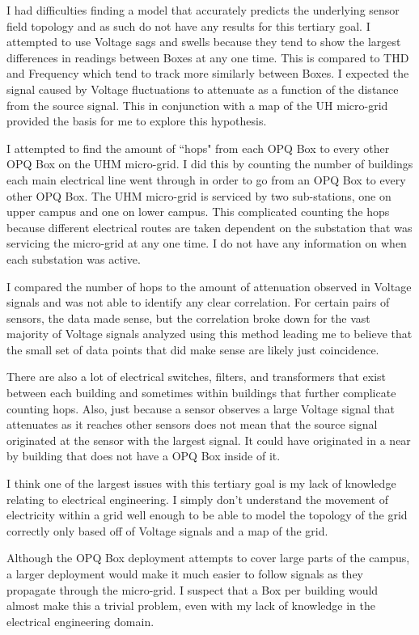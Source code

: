 I had difficulties finding a model that accurately predicts the underlying sensor field topology and as such do not have any results for this tertiary goal. I attempted to use Voltage sags and swells because they tend to show the largest differences in readings between Boxes at any one time. This is compared to THD and Frequency which tend to track more similarly between Boxes. I expected the signal caused by Voltage fluctuations to attenuate as a function of the distance from the source signal. This in conjunction with a map of the UH micro-grid provided the basis for me to explore this hypothesis.

I attempted to find the amount of ``hops" from each OPQ Box to every other OPQ Box on the UHM micro-grid. I did this by counting the number of buildings each main electrical line went through in order to go from an OPQ Box to every other OPQ Box. The UHM micro-grid is serviced by two sub-stations, one on upper campus and one on lower campus. This complicated counting the hops because different electrical routes are taken dependent on the substation that was servicing the micro-grid at any one time. I do not have any information on when each substation was active.

I compared the number of hops to the amount of attenuation observed in Voltage signals and was not able to identify any clear correlation. For certain pairs of sensors, the data made sense, but the correlation broke down for the vast majority of Voltage signals analyzed using this method leading me to believe that the small set of data points that did make sense are likely just coincidence.

There are also a lot of electrical switches, filters, and transformers that exist between each building and sometimes within buildings that further complicate counting hops. Also, just because a sensor observes a large Voltage signal that attenuates as it reaches other sensors does not mean that the source signal originated at the sensor with the largest signal. It could have originated in a near by building that does not have a OPQ Box inside of it.

I think one of the largest issues with this tertiary goal is my lack of knowledge relating to electrical engineering. I simply don't understand the movement of electricity within a grid well enough to be able to model the topology of the grid correctly only based off of Voltage signals and a map of the grid.

Although the OPQ Box deployment attempts to cover large parts of the campus, a larger deployment would make it much easier to follow signals as they propagate through the micro-grid. I suspect that a Box per building would almost make this a trivial problem, even with my lack of knowledge in the electrical engineering domain.

